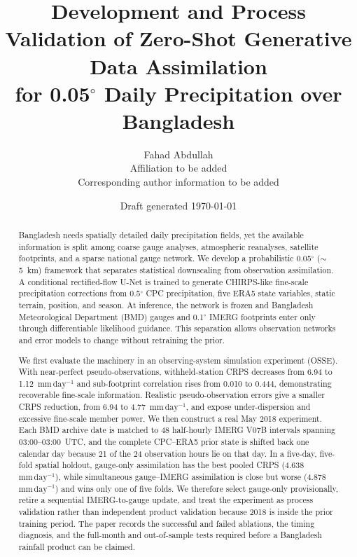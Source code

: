 \documentclass[10pt,twocolumn]{article}
\title{Development and Process Validation of Zero-Shot Generative Data Assimilation\\
for 0.05$^\circ$ Daily Precipitation over Bangladesh}
\author{Fahad Abdullah\\
\small Affiliation to be added\\
\small Corresponding author information to be added}
\date{Draft generated \today}
\newcommand{\mmday}{\mathrm{mm\,day^{-1}}}
\begin{document}
\maketitle

\begin{abstract}
Bangladesh needs spatially detailed daily precipitation fields, yet the available information is split among coarse gauge analyses, atmospheric reanalyses, satellite footprints, and a sparse national gauge network. We develop a probabilistic 0.05$^\circ$ ($\sim$5~km) framework that separates statistical downscaling from observation assimilation. A conditional rectified-flow U-Net is trained to generate CHIRPS-like fine-scale precipitation corrections from 0.5$^\circ$ CPC precipitation, five ERA5 state variables, static terrain, position, and season. At inference, the network is frozen and Bangladesh Meteorological Department (BMD) gauges and 0.1$^\circ$ IMERG footprints enter only through differentiable likelihood guidance. This separation allows observation networks and error models to change without retraining the prior.

We first evaluate the machinery in an observing-system simulation experiment (OSSE). With near-perfect pseudo-observations, withheld-station CRPS decreases from 6.94 to 1.12~$\mmday$ and sub-footprint correlation rises from 0.010 to 0.444, demonstrating recoverable fine-scale information. Realistic pseudo-observation errors give a smaller CRPS reduction, from 6.94 to 4.77~$\mmday$, and expose under-dispersion and excessive fine-scale member power. We then construct a real May 2018 experiment. Each BMD archive date is matched to 48 half-hourly IMERG V07B intervals spanning 03:00--03:00~UTC, and the complete CPC--ERA5 prior state is shifted back one calendar day because 21 of the 24 observation hours lie on that day. In a five-day, five-fold spatial holdout, gauge-only assimilation has the best pooled CRPS (4.638~$\mmday$), while simultaneous gauge--IMERG assimilation is close but worse (4.878~$\mmday$) and wins only one of five folds. We therefore select gauge-only provisionally, retire a sequential IMERG-to-gauge update, and treat the experiment as process validation rather than independent product validation because 2018 is inside the prior training period. The paper records the successful and failed ablations, the timing diagnosis, and the full-month and out-of-sample tests required before a Bangladesh rainfall product can be claimed.
\end{abstract}
\end{document}

